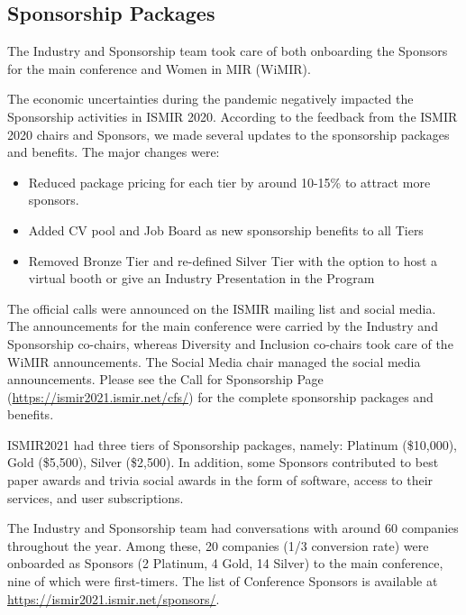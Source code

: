 \documentclass[%
10pt,								%
titlepage,						%
]
{scrartcl}
\begin{document}
        
    \subsection{Sponsorship Packages}
        The Industry and Sponsorship team took care of both onboarding the Sponsors for the main conference and Women in MIR (WiMIR).

        The economic uncertainties during the pandemic negatively impacted the Sponsorship activities in ISMIR 2020. According to the feedback from the ISMIR 2020 chairs and Sponsors, we made several updates to the sponsorship packages and benefits. The major changes were:
        \begin{itemize}
            \item Reduced package pricing for each tier by around 10-15\% to attract more sponsors. 
            \item Added CV pool and Job Board as new sponsorship benefits to all Tiers
            \item Removed Bronze Tier and re-defined Silver Tier with the option to host a virtual booth or give an Industry Presentation in the Program

        \end{itemize}
        The official calls were announced on the ISMIR mailing list and social media. The announcements for the main conference were carried by the Industry and Sponsorship co-chairs, whereas Diversity and Inclusion co-chairs took care of the WiMIR announcements. The Social Media chair managed the social media announcements. Please see the Call for Sponsorship Page (\href{https://ismir2021.ismir.net/cfs/}{https://ismir2021.ismir.net/cfs/}) for the complete sponsorship packages and benefits. 
        
        ISMIR2021 had three tiers of Sponsorship packages, namely: Platinum (\$10,000), Gold (\$5,500), Silver (\$2,500). In addition, some Sponsors contributed to best paper awards and trivia social awards in the form of software, access to their services, and user subscriptions.
        
        The Industry and Sponsorship team had conversations with around 60 companies throughout the year. Among these, 20 companies (1/3 conversion rate) were onboarded as Sponsors (2 Platinum, 4 Gold, 14 Silver) to the main conference, nine of which were first-timers. The list of Conference Sponsors is available at \href{https://ismir2021.ismir.net/sponsors/}{https://ismir2021.ismir.net/sponsors/}. 
        
\end{document}
